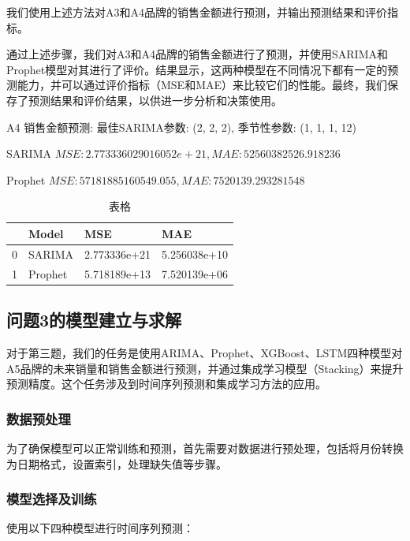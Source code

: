 \documentclass[a4paper]{article}
\begin{document}
	我们使用上述方法对A3和A4品牌的销售金额进行预测，并输出预测结果和评价指标。

	通过上述步骤，我们对A3和A4品牌的销售金额进行了预测，并使用SARIMA和Prophet模型对其进行了评价。结果显示，这两种模型在不同情况下都有一定的预测能力，并可以通过评价指标（MSE和MAE）来比较它们的性能。最终，我们保存了预测结果和评价结果，以供进一步分析和决策使用。
	
	A4 销售金额预测:
	最佳SARIMA参数: (2, 2, 2), 季节性参数: (1, 1, 1, 12)

	SARIMA $MSE: 2.773336029016052e+21, MAE: 52560382526.918236$

	Prophet $MSE: 57181885160549.055, MAE: 7520139.293281548$
	
	\begin{table}[H]

		\centering
	
		\begin{tabularx}{\textwidth}{|X|X|X|X|} %
	
		\hline
	
			&Model          & MSE        &   MAE\\
		\hline
		0   &SARIMA  &2.773336e+21  &5.256038e+10\\
		\hline
		1  &Prophet  &5.718189e+13 & 7.520139e+06\\
	
		\hline
		\end{tabularx}
	
		\caption{表格}
	
	\end{table}

	\subsection{问题3的模型建立与求解}
	对于第三题，我们的任务是使用ARIMA、Prophet、XGBoost、LSTM四种模型对A5品牌的未来销量和销售金额进行预测，并通过集成学习模型（Stacking）来提升预测精度。这个任务涉及到时间序列预测和集成学习方法的应用。
	\subsubsection{数据预处理}
	为了确保模型可以正常训练和预测，首先需要对数据进行预处理，包括将月份转换为日期格式，设置索引，处理缺失值等步骤。

	\subsubsection{模型选择及训练}
	使用以下四种模型进行时间序列预测：
\end{document}
